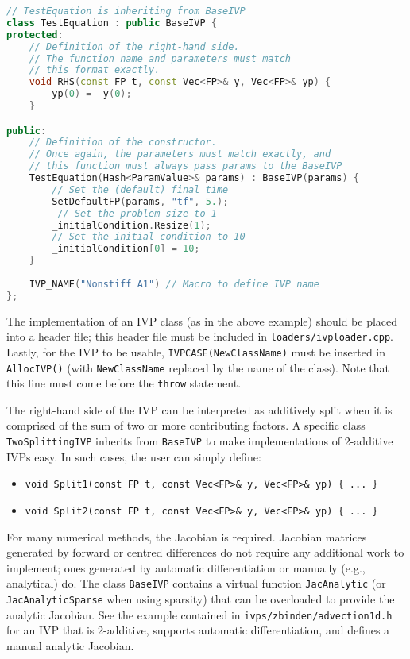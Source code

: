 \documentclass[11pt]{article}
\begin{document}
\begin{lstlisting}[tabsize=4,language=c++]
// TestEquation is inheriting from BaseIVP
class TestEquation : public BaseIVP {	
protected: 
	// Definition of the right-hand side.
	// The function name and parameters must match
	// this format exactly.
	void RHS(const FP t, const Vec<FP>& y, Vec<FP>& yp) {
		yp(0) = -y(0);
	}

public:
	// Definition of the constructor.
	// Once again, the parameters must match exactly, and
	// this function must always pass params to the BaseIVP
	TestEquation(Hash<ParamValue>& params) : BaseIVP(params) {
		// Set the (default) final time
		SetDefaultFP(params, "tf", 5.);
		 // Set the problem size to 1
		_initialCondition.Resize(1);
		// Set the initial condition to 10
		_initialCondition[0] = 10;
	}
	
	IVP_NAME("Nonstiff A1") // Macro to define IVP name
};
\end{lstlisting}

The implementation of an IVP class (as in the above example) should be
placed into a header file; this header file must be included in
\verb=loaders/ivploader.cpp=. Lastly, for the IVP to be usable,
\verb=IVPCASE(NewClassName)= must be inserted in \verb=AllocIVP()= (with
\verb=NewClassName= replaced by the name of the class). Note that this
line must come before the \verb=throw= statement.

The right-hand side of the IVP can be interpreted as additively split
when it is comprised of the sum of two or more contributing factors. A
specific class \verb=TwoSplittingIVP= inherits from \verb=BaseIVP= to
make implementations of 2-additive IVPs easy. In such cases, the user can
simply define:
\begin{itemize}
\item \verb=void Split1(const FP t, const Vec<FP>& y, Vec<FP>& yp) { ... }=
\item \verb=void Split2(const FP t, const Vec<FP>& y, Vec<FP>& yp) { ... }=
\end{itemize}

For many numerical methods, the Jacobian is required. Jacobian
matrices generated by forward or centred differences do not require
any additional work to implement; ones generated by automatic
differentiation or manually (e.g., analytical) do. The class
\verb=BaseIVP= contains a virtual function \verb=JacAnalytic= (or
\verb=JacAnalyticSparse= when using sparsity) that can be overloaded
to provide the analytic Jacobian. See the example contained in
\verb=ivps/zbinden/advection1d.h= for an IVP that is 2-additive,
supports automatic differentiation, and defines a manual analytic
Jacobian.
\end{document}
